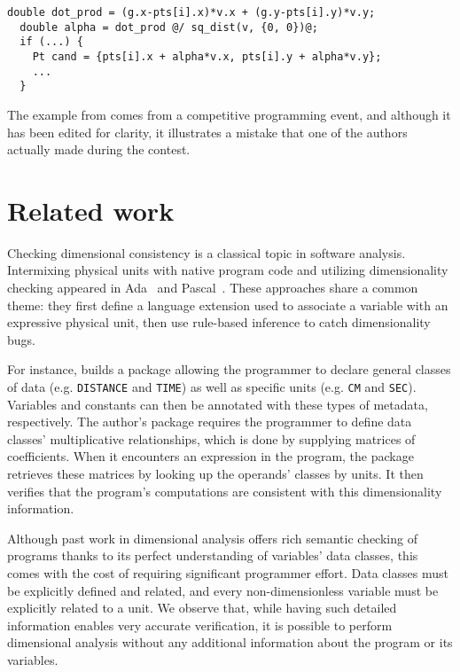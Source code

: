 \documentclass[12pt]{article}
\begin{document}
\begin{lstlisting}[label=code:example1,caption=Example of a dimensional bug]
  double dot_prod = (g.x-pts[i].x)*v.x + (g.y-pts[i].y)*v.y;
  double alpha = dot_prod @/ sq_dist(v, {0, 0})@;
  if (...) {
    Pt cand = {pts[i].x + alpha*v.x, pts[i].y + alpha*v.y};
    ...
  }
\end{lstlisting}

The example from  comes from a competitive programming event, and although it has been edited for clarity, it illustrates a mistake that one of the authors actually made during the contest. %

\section{Related work}

Checking dimensional consistency is a classical topic in software analysis.
Intermixing physical units with native program code and utilizing dimensionality checking appeared in Ada~\cite{hilfinger1988ada} and Pascal~\cite{dreiheller1986programming, gehani1977units}.
These approaches share a common theme: they first define a language extension used to associate a variable with an expressive physical unit, then use rule-based inference to catch dimensionality bugs.

For instance, \cite{hilfinger1988ada} builds a package allowing the programmer to declare general classes of data (e.g. \texttt{DISTANCE} and \texttt{TIME}) as well as specific units (e.g. \texttt{CM} and \texttt{SEC}).
Variables and constants can then be annotated with these types of metadata, respectively.
The author's package requires the programmer to define data classes' multiplicative relationships, which is done by supplying matrices of coefficients.
When it encounters an expression in the program, the package retrieves these matrices by looking up the operands' classes by units.
It then verifies that the program's computations are consistent with this dimensionality information.

Although past work in dimensional analysis offers rich semantic checking of programs thanks to its perfect understanding of variables' data classes, this comes with the cost of requiring significant programmer effort.
Data classes must be explicitly defined and related, and every non-dimensionless variable must be explicitly related to a unit.
We observe that, while having such detailed information enables very accurate verification, it is possible to perform dimensional analysis without any additional information about the program or its variables.
\end{document}
